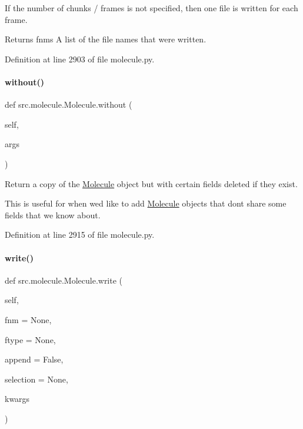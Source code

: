 If the number of chunks / frames is not specified, then one file is written for each frame.

\begin{DoxyReturn}{Returns}
fnms A list of the file names that were written. 
\end{DoxyReturn}


Definition at line 2903 of file molecule.\+py.

\mbox{\label{classsrc_1_1molecule_1_1Molecule_aeab236a12cffd66ce282c1a7d03af7f9}} 
\paragraph{\texorpdfstring{without()}{without()}}
{\footnotesize\ttfamily def src.\+molecule.\+Molecule.\+without (\begin{DoxyParamCaption}\item[{}]{self,  }\item[{}]{args }\end{DoxyParamCaption})}



Return a copy of the \hyperlink{classsrc_1_1molecule_1_1Molecule}{Molecule} object but with certain fields deleted if they exist. 

This is useful for when we\textquotesingle{}d like to add \hyperlink{classsrc_1_1molecule_1_1Molecule}{Molecule} objects that don\textquotesingle{}t share some fields that we know about. 

Definition at line 2915 of file molecule.\+py.

\mbox{\label{classsrc_1_1molecule_1_1Molecule_a557af72409188133ef446ee8dbed2338}} 
\paragraph{\texorpdfstring{write()}{write()}}
{\footnotesize\ttfamily def src.\+molecule.\+Molecule.\+write (\begin{DoxyParamCaption}\item[{}]{self,  }\item[{}]{fnm = {\ttfamily None},  }\item[{}]{ftype = {\ttfamily None},  }\item[{}]{append = {\ttfamily False},  }\item[{}]{selection = {\ttfamily None},  }\item[{}]{kwargs }\end{DoxyParamCaption})}



